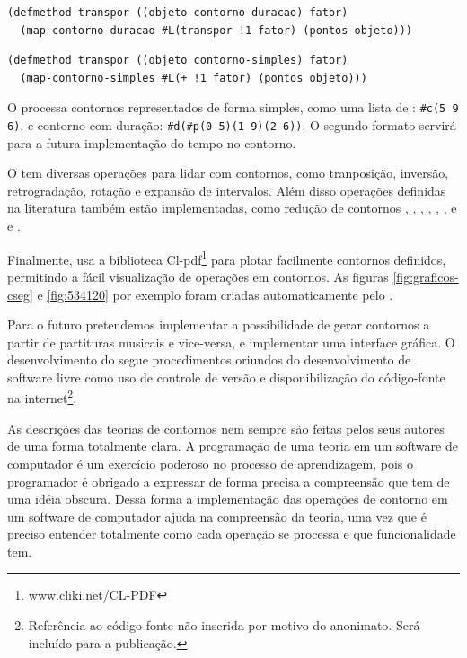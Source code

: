 \begin{verbatim}
(defmethod transpor ((objeto contorno-duracao) fator)
  (map-contorno-duracao #L(transpor !1 fator) (pontos objeto)))
\end{verbatim}

\begin{verbatim}
(defmethod transpor ((objeto contorno-simples) fator)
  (map-contorno-simples #L(+ !1 fator) (pontos objeto)))
\end{verbatim}

O \goiaba{} processa contornos representados de forma simples, como
uma lista de : \verb!#c(5 9 6)!, e contorno com
duração: \verb!#d(#p(0 5)(1 9)(2 6))!. O segundo formato servirá para
a futura implementação do tempo no contorno.

O \goiaba{} tem diversas operações para lidar com contornos, como
tranposição, inversão, retrogradação, rotação e expansão de
intervalos. Além disso operações definidas na literatura também estão
implementadas, como redução de contornos \cite{adams76:melodic},
, , , , ,
 e  \cite{friedmann85:methodology} e
 \cite{morris93:directions}.

Finalmente, \goiaba{} usa a biblioteca
Cl-pdf\footnote{www.cliki.net/CL-PDF} para plotar facilmente contornos
definidos, permitindo a fácil visualização de operações em
contornos. As figuras \ref{fig:graficos-cseg} e \ref{fig:534120} por
exemplo foram criadas automaticamente pelo \goiaba{}.

Para o futuro pretendemos implementar a possibilidade de gerar
contornos a partir de partituras musicais e vice-versa, e implementar
uma interface gráfica. O desenvolvimento do \goiaba{} segue
procedimentos oriundos do desenvolvimento de software livre como uso
de controle de versão e disponibilização do código-fonte na
internet\footnote{Referência ao código-fonte não inserida por motivo
  do anonimato. Será incluído para a publicação.}.

As descrições das teorias de contornos nem sempre são feitas pelos
seus autores de uma forma totalmente clara. A programação de uma
teoria em um software de computador é um exercício poderoso no
processo de aprendizagem, pois o programador é obrigado a expressar de
forma precisa a compreensão que tem de uma idéia obscura. Dessa forma
a implementação das operações de contorno em um software de computador
ajuda na compreensão da teoria, uma vez que é preciso entender
totalmente como cada operação se processa e que funcionalidade tem.

